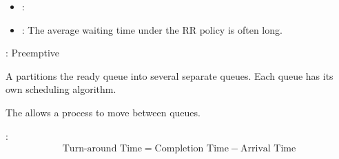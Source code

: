     \begin{itemize}
      \item {}:
      \item {}: The average waiting time under the RR policy is often long.
    \end{itemize}


    \par {}: Preemptive

    \par A  partitions the ready queue into several separate queues.  Each queue has its own scheduling algorithm.

    \par The  allows a process to move between queues.

    \par {}:
    \begin{align*}
      \text{Turn-around Time} = \text{Completion Time} - \text{Arrival Time}
    \end{align*}
